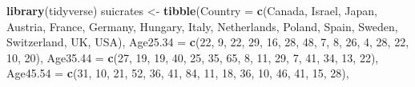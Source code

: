 \documentclass[
]{article}
\newenvironment{Shaded}{\begin{snugshade}}{\end{snugshade}}
\newcommand{\AttributeTok}[1]{\textcolor[rgb]{0.13,0.29,0.53}{#1}}
\newcommand{\DecValTok}[1]{\textcolor[rgb]{0.00,0.00,0.81}{#1}}
\newcommand{\FunctionTok}[1]{\textcolor[rgb]{0.13,0.29,0.53}{\textbf{#1}}}
\newcommand{\NormalTok}[1]{#1}
\newcommand{\OtherTok}[1]{\textcolor[rgb]{0.56,0.35,0.01}{#1}}
\newcommand{\StringTok}[1]{\textcolor[rgb]{0.31,0.60,0.02}{#1}}
\begin{document}
\begin{Shaded}
\begin{Highlighting}[]
\FunctionTok{library}\NormalTok{(tidyverse)}
\NormalTok{ suicrates }\OtherTok{\textless{}{-}} \FunctionTok{tibble}\NormalTok{(}\AttributeTok{Country =} \FunctionTok{c}\NormalTok{(}\StringTok{\textquotesingle{}Canada\textquotesingle{}}\NormalTok{, }\StringTok{\textquotesingle{}Israel\textquotesingle{}}\NormalTok{, }\StringTok{\textquotesingle{}Japan\textquotesingle{}}\NormalTok{, }\StringTok{\textquotesingle{}Austria\textquotesingle{}}\NormalTok{, }\StringTok{\textquotesingle{}France\textquotesingle{}}\NormalTok{, }\StringTok{\textquotesingle{}Germany\textquotesingle{}}\NormalTok{,}
 \StringTok{\textquotesingle{}Hungary\textquotesingle{}}\NormalTok{, }\StringTok{\textquotesingle{}Italy\textquotesingle{}}\NormalTok{, }\StringTok{\textquotesingle{}Netherlands\textquotesingle{}}\NormalTok{, }\StringTok{\textquotesingle{}Poland\textquotesingle{}}\NormalTok{, }\StringTok{\textquotesingle{}Spain\textquotesingle{}}\NormalTok{, }\StringTok{\textquotesingle{}Sweden\textquotesingle{}}\NormalTok{, }\StringTok{\textquotesingle{}Switzerland\textquotesingle{}}\NormalTok{, }\StringTok{\textquotesingle{}UK\textquotesingle{}}\NormalTok{, }\StringTok{\textquotesingle{}USA\textquotesingle{}}\NormalTok{),}
 \AttributeTok{Age25.34 =} \FunctionTok{c}\NormalTok{(}\DecValTok{22}\NormalTok{, }\DecValTok{9}\NormalTok{, }\DecValTok{22}\NormalTok{, }\DecValTok{29}\NormalTok{, }\DecValTok{16}\NormalTok{, }\DecValTok{28}\NormalTok{, }\DecValTok{48}\NormalTok{, }\DecValTok{7}\NormalTok{, }\DecValTok{8}\NormalTok{, }\DecValTok{26}\NormalTok{, }\DecValTok{4}\NormalTok{, }\DecValTok{28}\NormalTok{, }\DecValTok{22}\NormalTok{, }\DecValTok{10}\NormalTok{, }\DecValTok{20}\NormalTok{),}
 \AttributeTok{Age35.44 =} \FunctionTok{c}\NormalTok{(}\DecValTok{27}\NormalTok{, }\DecValTok{19}\NormalTok{, }\DecValTok{19}\NormalTok{, }\DecValTok{40}\NormalTok{, }\DecValTok{25}\NormalTok{, }\DecValTok{35}\NormalTok{, }\DecValTok{65}\NormalTok{, }\DecValTok{8}\NormalTok{, }\DecValTok{11}\NormalTok{, }\DecValTok{29}\NormalTok{, }\DecValTok{7}\NormalTok{, }\DecValTok{41}\NormalTok{, }\DecValTok{34}\NormalTok{, }\DecValTok{13}\NormalTok{, }\DecValTok{22}\NormalTok{),}
 \AttributeTok{Age45.54 =} \FunctionTok{c}\NormalTok{(}\DecValTok{31}\NormalTok{, }\DecValTok{10}\NormalTok{, }\DecValTok{21}\NormalTok{, }\DecValTok{52}\NormalTok{, }\DecValTok{36}\NormalTok{, }\DecValTok{41}\NormalTok{, }\DecValTok{84}\NormalTok{, }\DecValTok{11}\NormalTok{, }\DecValTok{18}\NormalTok{, }\DecValTok{36}\NormalTok{, }\DecValTok{10}\NormalTok{, }\DecValTok{46}\NormalTok{, }\DecValTok{41}\NormalTok{, }\DecValTok{15}\NormalTok{, }\DecValTok{28}\NormalTok{),}

\end{Highlighting}
\end{Shaded}
\end{document}
